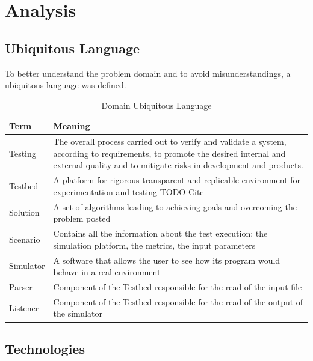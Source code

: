 \documentclass[12pt,a4paper,openright,twoside]{book}
\begin{document}
\chapter{Analysis}

\section{Ubiquitous Language}

To better understand the problem domain and to avoid misunderstandings, a ubiquitous language was defined.

\begin{table}[h]
    \centering
    \begin{tabular}{|l|p{}|}
    \toprule
    \textbf{Term} & \textbf{Meaning} \\
    \midrule                                                                                                                                                              
    Testing & The overall process carried out to verify and validate a system, according to requirements, to promote the desired internal and external quality and to mitigate risks in development and products. \\ \hline
    Testbed & A platform for rigorous transparent and replicable environment for experimentation and testing TODO Cite \\ \hline
    Solution & A set of algorithms leading to achieving goals and overcoming the problem posted \\ \hline
    Scenario & Contains all the information about the test execution: the simulation platform, the metrics, the input parameters \\ \hline
    Simulator & A software that allows the user to see how its program would behave in a real environment \\ \hline
    Parser & Component of the Testbed responsible for the read of the input file \\ \hline
    Listener & Component of the Testbed responsible for the read of the output of the simulator \\ \hline
    \end{tabular}
    \caption{Domain Ubiquitous Language}
    \end{table}

\section{Technologies}
\end{document}
